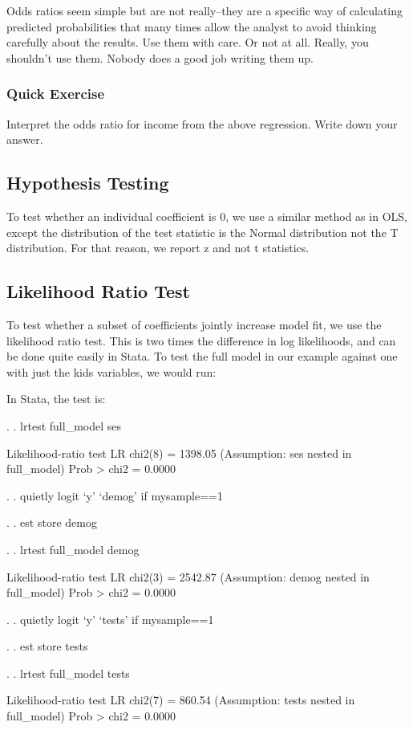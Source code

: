 \documentclass[12pt]{article}
\begin{document}
Odds ratios seem simple but are not really--they are a specific way of
calculating predicted probabilities that many times allow the analyst
to avoid thinking carefully about the results. Use them with care. Or
not at all. Really, you shouldn't use them. Nobody does a good job
writing them up. 


\subsubsection{Quick Exercise}

Interpret the odds ratio for income from the above regression. Write
down your answer.


\subsection{Hypothesis Testing}

To test whether an individual coefficient is 0, we use  a similar
method as in OLS, except the distribution of the test statistic is the
Normal distribution not the T distribution. For that reason, we report
z and not t statistics. 

\subsection{Likelihood Ratio Test}

To test whether a subset of coefficients jointly increase model fit,
we use the likelihood ratio test. This is two times the difference in
log likelihoods, and can be done quite easily in Stata. To test the
full model in our example against one with just the kids variables, we
would run:

In Stata, the test is: 

\begin{stlog}


. 
. lrtest full_model ses

Likelihood-ratio test                                 LR chi2(8)  =   1398.05
(Assumption: ses nested in full_model)                Prob > chi2 =    0.0000

. 
. quietly logit `y'  `demog' if mysample==1

. 
. est store demog

. 
. lrtest full_model demog

Likelihood-ratio test                                 LR chi2(3)  =   2542.87
(Assumption: demog nested in full_model)              Prob > chi2 =    0.0000

. 
. quietly logit `y' `tests' if mysample==1

. 
. est store tests

. 
. lrtest full_model tests

Likelihood-ratio test                                 LR chi2(7)  =    860.54
(Assumption: tests nested in full_model)              Prob > chi2 =    0.0000


\end{stlog}
\end{document}
